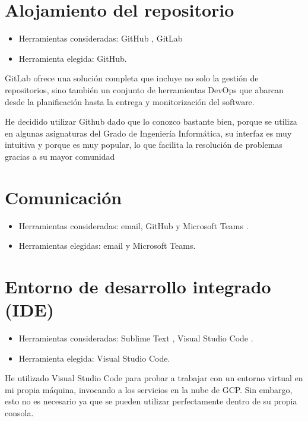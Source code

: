 \section{Alojamiento del repositorio}\label{alojamiento_repositorio}
\begin{itemize}
\item
  Herramientas consideradas: GitHub \citep{online:github}, GitLab \citep{online:gitlab}
\item
  Herramienta elegida: GitHub. 
\end{itemize}
GitLab ofrece una solución completa que incluye no solo la gestión de repositorios, sino también un conjunto de herramientas DevOps que abarcan desde la planificación hasta la entrega y monitorización del software.

He decidido utilizar Github dado que lo conozco bastante bien, porque se utiliza en algunas asignaturas del Grado de Ingeniería Informática, su interfaz es muy intuitiva y porque es muy popular, lo que facilita la resolución de problemas gracias a su mayor comunidad

\section{Comunicación}\label{comunicacion}

\begin{itemize}
\tightlist
\item
  Herramientas consideradas: email, GitHub y Microsoft Teams \citep{online:ms_teams}.
\item
  Herramientas elegidas: email y Microsoft Teams. 
\end{itemize}

\section{Entorno de desarrollo integrado (IDE)}\label{ide}
\begin{itemize}
\tightlist
\item
  Herramientas consideradas: Sublime Text \citep{online:sublime_text}, Visual Studio Code \citep{online:vs_code}.
\item
  Herramienta elegida: Visual Studio Code. 
\end{itemize}

He utilizado Visual Studio Code para probar a trabajar con un entorno virtual en mi propia máquina, invocando a los servicios en la nube de GCP. Sin embargo, esto no es necesario ya que se pueden utilizar perfectamente dentro de su propia consola.


